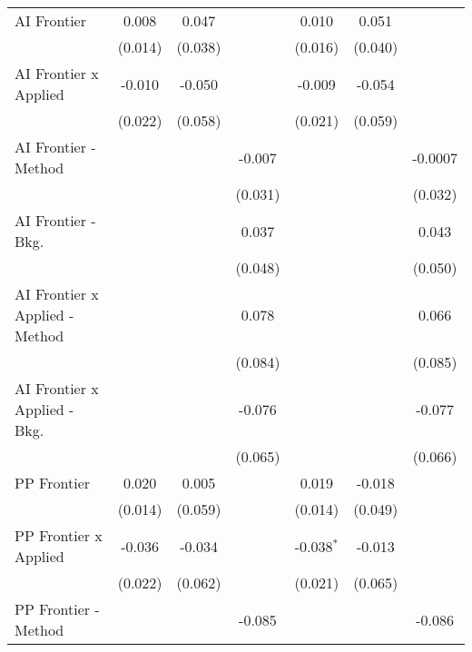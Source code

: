 \begin{tabular}{lcccccc}
   AI Frontier                    & 0.008   & 0.047         &                & 0.010        & 0.051         &   \\   
                                  & (0.014) & (0.038)       &                & (0.016)      & (0.040)       &   \\   
   AI Frontier x Applied          & -0.010  & -0.050        &                & -0.009       & -0.054        &   \\   
                                  & (0.022) & (0.058)       &                & (0.021)      & (0.059)       &   \\   
   AI Frontier - Method           &         &               & -0.007         &              &               & -0.0007\\   
                                  &         &               & (0.031)        &              &               & (0.032)\\   
   AI Frontier - Bkg.             &         &               & 0.037          &              &               & 0.043\\   
                                  &         &               & (0.048)        &              &               & (0.050)\\   
   AI Frontier x Applied - Method &         &               & 0.078          &              &               & 0.066\\   
                                  &         &               & (0.084)        &              &               & (0.085)\\   
   AI Frontier x Applied - Bkg.   &         &               & -0.076         &              &               & -0.077\\   
                                  &         &               & (0.065)        &              &               & (0.066)\\   
   PP Frontier                    & 0.020   & 0.005         &                & 0.019        & -0.018        &   \\   
                                  & (0.014) & (0.059)       &                & (0.014)      & (0.049)       &   \\   
   PP Frontier x Applied          & -0.036  & -0.034        &                & -0.038$^{*}$ & -0.013        &   \\   
                                  & (0.022) & (0.062)       &                & (0.021)      & (0.065)       &   \\   
   PP Frontier - Method           &         &               & -0.085         &              &               & -0.086\\   

\end{tabular}
